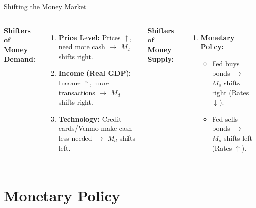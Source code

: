 \documentclass[aspectratio=169]{beamer}
\begin{document}
\begin{frame}{Shifting the Money Market}
    \begin{columns}
        \textbf{Shifters of Money Demand:}
        \begin{enumerate}
            \item \textbf{Price Level:} Prices $\uparrow$, need more cash $\rightarrow$ $M_d$ shifts right.
            \item \textbf{Income (Real GDP):} Income $\uparrow$, more transactions $\rightarrow$ $M_d$ shifts right.
            \item \textbf{Technology:} Credit cards/Venmo make cash less needed $\rightarrow$ $M_d$ shifts left.
        \end{enumerate}

        \textbf{Shifters of Money Supply:}
        \begin{enumerate}
            \item \textbf{Monetary Policy:}
            \begin{itemize}
                \item Fed buys bonds $\rightarrow$ $M_s$ shifts right (Rates $\downarrow$).
                \item Fed sells bonds $\rightarrow$ $M_s$ shifts left (Rates $\uparrow$).
            \end{itemize}
        \end{enumerate}
    \end{columns}
\end{frame}

\section{Monetary Policy}
\end{document}
